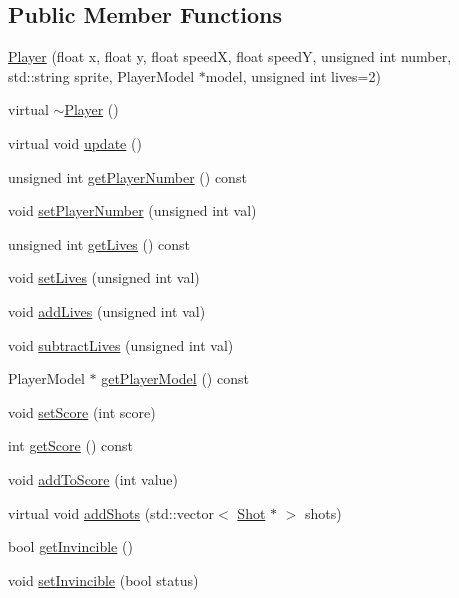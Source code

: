 \subsection*{Public Member Functions}
\begin{DoxyCompactItemize}
\item 
\hyperlink{class_player_a28f6d1f3509fc57c77784b1d540c0dbf}{Player} (float x, float y, float speedX, float speedY, unsigned int number, std::string sprite, PlayerModel $\ast$model, unsigned int lives=2)
\item 
virtual \hyperlink{class_player_a749d2c00e1fe0f5c2746f7505a58c062}{$\sim$Player} ()
\item 
virtual void \hyperlink{class_player_a82c3476f3e65a4e2ac6bcd040771bdd4}{update} ()
\item 
unsigned int \hyperlink{class_player_af680a046d4597e159956da95b07a87e3}{getPlayerNumber} () const 
\item 
void \hyperlink{class_player_a8201669c6096fa5cf902652a385cc863}{setPlayerNumber} (unsigned int val)
\item 
unsigned int \hyperlink{class_player_a1cb5543d570ece1148d46d571937f56b}{getLives} () const 
\item 
void \hyperlink{class_player_a98f2db1c28350e43745cb0c49282c7cb}{setLives} (unsigned int val)
\item 
void \hyperlink{class_player_a2c0f29adffb4f7eee3ee334cf66db499}{addLives} (unsigned int val)
\item 
void \hyperlink{class_player_a54ee3ef0e752924759ed61a1ca7bf59f}{subtractLives} (unsigned int val)
\item 
PlayerModel $\ast$ \hyperlink{class_player_af7d45973f07ac7cb1035c5e652e04f24}{getPlayerModel} () const 
\item 
void \hyperlink{class_player_a23c9b25aeb8dd1ff86d03d993e07a73d}{setScore} (int score)
\item 
int \hyperlink{class_player_ac10eb9fb0387f565134958d129585ac6}{getScore} () const 
\item 
void \hyperlink{class_player_ae9f35befb9fb4239cab7a3f5553b8ac2}{addToScore} (int value)
\item 
virtual void \hyperlink{class_player_a47ca4197c52a2ee0952abddd519d8506}{addShots} (std::vector$<$ \hyperlink{class_shot}{Shot} $\ast$ $>$ shots)
\item 
bool \hyperlink{class_player_a35c75510e8be559cb1f9272bfc11d026}{getInvincible} ()
\item 
void \hyperlink{class_player_af85decd14ae3ac2785feecf73bd75c5c}{setInvincible} (bool status)
\end{DoxyCompactItemize}


